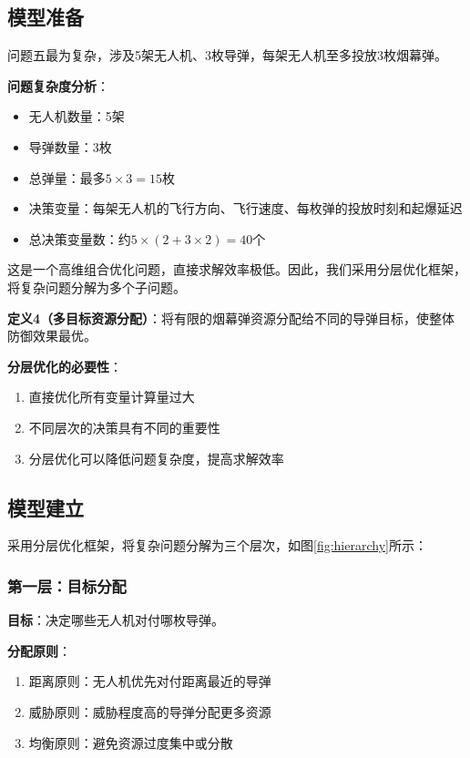 \documentclass[12pt,a4paper]{article}
\begin{document}
\subsection{模型准备}

问题五最为复杂，涉及5架无人机、3枚导弹，每架无人机至多投放3枚烟幕弹。

\textbf{问题复杂度分析}：
\begin{itemize}
    \item 无人机数量：5架
    \item 导弹数量：3枚
    \item 总弹量：最多$5 \times 3 = 15$枚
    \item 决策变量：每架无人机的飞行方向、飞行速度、每枚弹的投放时刻和起爆延迟
    \item 总决策变量数：约$5 \times (2 + 3 \times 2) = 40$个
\end{itemize}

这是一个高维组合优化问题，直接求解效率极低。因此，我们采用分层优化框架，将复杂问题分解为多个子问题。

\textbf{定义4（多目标资源分配）}：将有限的烟幕弹资源分配给不同的导弹目标，使整体防御效果最优。

\textbf{分层优化的必要性}：
\begin{enumerate}
    \item 直接优化所有变量计算量过大
    \item 不同层次的决策具有不同的重要性
    \item 分层优化可以降低问题复杂度，提高求解效率
\end{enumerate}

\subsection{模型建立}

采用分层优化框架，将复杂问题分解为三个层次，如图\ref{fig:hierarchy}所示：

\subsubsection{第一层：目标分配}

\textbf{目标}：决定哪些无人机对付哪枚导弹。

\textbf{分配原则}：
\begin{enumerate}
    \item 距离原则：无人机优先对付距离最近的导弹
    \item 威胁原则：威胁程度高的导弹分配更多资源
    \item 均衡原则：避免资源过度集中或分散
\end{enumerate}
\end{document}
